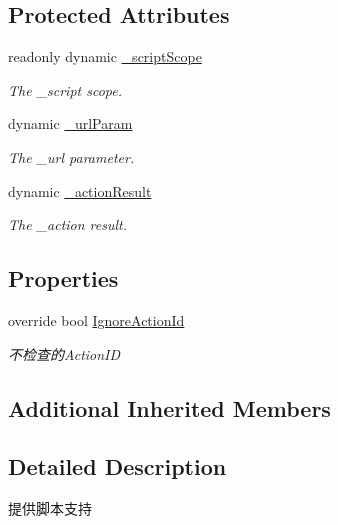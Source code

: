 \subsection*{Protected Attributes}
\begin{DoxyCompactItemize}
\item 
readonly dynamic \mbox{\hyperlink{class_t_net_1_1_contract_1_1_action_1_1_script_action_a2250261d7a6c2454da845cfcc1dcccdb}{\+\_\+script\+Scope}}
\begin{DoxyCompactList}\small\item\em The \+\_\+script scope. \end{DoxyCompactList}\item 
dynamic \mbox{\hyperlink{class_t_net_1_1_contract_1_1_action_1_1_script_action_aabaeb9540ead488f73d5a59c26b8f98a}{\+\_\+url\+Param}}
\begin{DoxyCompactList}\small\item\em The \+\_\+url parameter. \end{DoxyCompactList}\item 
dynamic \mbox{\hyperlink{class_t_net_1_1_contract_1_1_action_1_1_script_action_a6f8c50eaddc7bc7744cbebd589838bef}{\+\_\+action\+Result}}
\begin{DoxyCompactList}\small\item\em The \+\_\+action result. \end{DoxyCompactList}\end{DoxyCompactItemize}
\subsection*{Properties}
\begin{DoxyCompactItemize}
\item 
override bool \mbox{\hyperlink{class_t_net_1_1_contract_1_1_action_1_1_script_action_a3ca2a972899c24cb5d7590a4ff92137c}{Ignore\+Action\+Id}}
\begin{DoxyCompactList}\small\item\em 不检查的\+Action\+ID \end{DoxyCompactList}\end{DoxyCompactItemize}
\subsection*{Additional Inherited Members}


\subsection{Detailed Description}
提供脚本支持 



